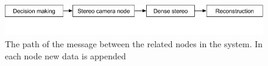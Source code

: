 \begin{figure}[htb]
	\begin{center}
		\includegraphics[scale=0.5,trim=0 50 0 0]{graphics/04_decisionmaking/message_path.png}%
		\caption{The path of the message between the related nodes in the system. In each node new data is appended}
		\label{fig:message_path}
	\end{center}
\end{figure}


